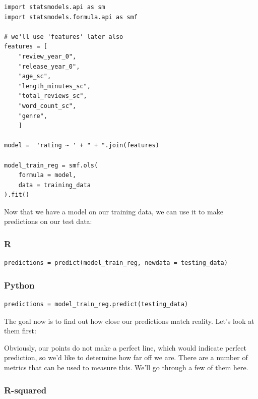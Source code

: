 \documentclass[
  letterpaper,
]{krantz}
\begin{document}
\begin{verbatim}
import statsmodels.api as sm
import statsmodels.formula.api as smf

# we'll use 'features' later also
features = [
    "review_year_0", 
    "release_year_0",
    "age_sc", 
    "length_minutes_sc", 
    "total_reviews_sc", 
    "word_count_sc", 
    "genre", 
    ]

model =  'rating ~ ' + " + ".join(features)

model_train_reg = smf.ols(
    formula = model,
    data = training_data
).fit()
\end{verbatim}

Now that we have a model on our training data, we can use it to make
predictions on our test data:

\subsubsection{R}

\begin{verbatim}
predictions = predict(model_train_reg, newdata = testing_data)
\end{verbatim}

\subsubsection{Python}

\begin{verbatim}
predictions = model_train_reg.predict(testing_data)
\end{verbatim}

The goal now is to find out how close our predictions match reality.
Let's look at them first:

\begin{figure}[H]


\caption{\label{fig-pred-vs-obs}}

\end{figure}%

Obviously, our points do not make a perfect line, which would indicate
perfect prediction, so we'd like to determine how far off we are. There
are a number of metrics that can be used to measure this. We'll go
through a few of them here.

\subsubsection{R-squared}\label{sec-knowing-metrics-r2}
\end{document}
